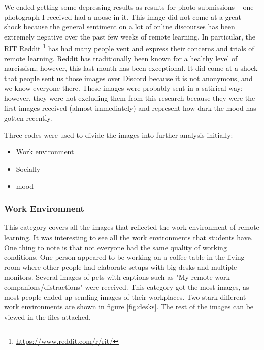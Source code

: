 \documentclass[12pt,
 reprint,
nofootinbib,
 amsmath,amssymb,
 aps,
floatfix,
]{revtex4-2}
\begin{document}
We ended getting some depressing results as results for photo submissions -- one photograph I received had a noose in it. This image did not come at a great shock because the general sentiment on a lot of online discourses has been extremely negative over the past few weeks of remote learning. In particular, the RIT Reddit \footnote{\url{https://www.reddit.com/r/rit/}} has had many people vent and express their concerns and trials of remote learning. Reddit has traditionally been known for a healthy level of narcissism; however, this last month has been exceptional. It did come at a shock that people sent us those images over Discord because it is not anonymous, and we know everyone there. These images were probably sent in a satirical way; however,  they were not excluding them from this research because they were the first images received (almost immediately) and represent how dark the mood has gotten recently.

Three codes were used to divide the images into further analysis initially:

\begin{itemize}
    \item Work environment
    \item Socially
    \item mood
\end{itemize}

\subsubsection{Work Environment}

This category covers all the images that reflected the work environment of remote learning. It was interesting to see all the work environments that students have. One thing to note is that not everyone had the same quality of working conditions. One person appeared to be working on a coffee table in the living room where other people had elaborate setups with big desks and multiple monitors. Several images of pets with captions such as "My remote work companions/distractions" were received. This category got the most images, as most people ended up sending images of their workplaces. Two stark different work environments are shown in figure \ref{fig:desks}. The rest of the images can be viewed in the files attached. 
\end{document}
